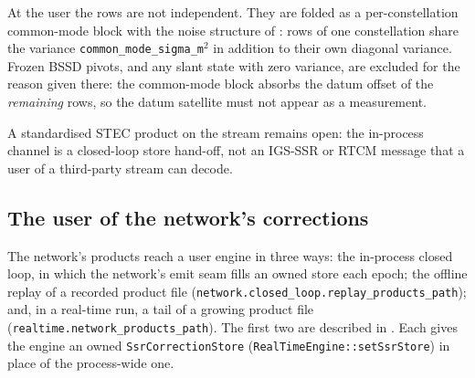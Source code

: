 \documentclass[main.tex]{subfiles}
\begin{document}
At the user the rows are not independent. They are folded as a
per-constellation common-mode block with the noise structure of
: rows of one
constellation share the variance \texttt{common\_mode\_sigma\_m}$^2$ in
addition to their own diagonal variance. Frozen BSSD
pivots, and any slant state with zero variance, are excluded for the reason
given there: the common-mode block absorbs the datum offset of the
\emph{remaining} rows, so the datum satellite must not appear as a
measurement.

A standardised STEC product on the stream remains open: the in-process
channel is a closed-loop store hand-off, not an IGS-SSR or RTCM message
that a user of a third-party stream can decode.

\subsection{The user of the network's corrections}\label{sec:ssr-netuser}

The network's products reach a user engine in three ways: the in-process
closed loop, in which the network's emit seam fills an owned store each
epoch; the offline replay of a recorded product file
(\texttt{network.closed\_loop.replay\_products\_path}); and, in a real-time
run, a tail of a growing product file
(\texttt{realtime.network\_products\_path}). The first two are described in
. Each gives the engine an owned \texttt{SsrCorrectionStore}
(\texttt{RealTimeEngine::setSsrStore}) in place of the process-wide one.
\end{document}
